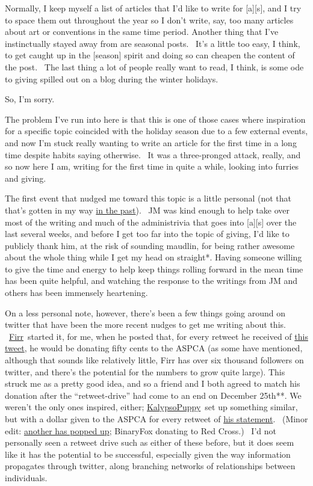 Normally, I keep myself a list of articles that I'd like to write for
{[}a{]}{[}s{]}, and I try to space them out throughout the year so I
don't write, say, too many articles about art or conventions in the same
time period. Another thing that I've instinctually stayed away from are
seasonal posts. ~It's a little too easy, I think, to get caught up in
the {[}season{]} spirit and doing so can cheapen the content of the
post. ~The last thing a lot of people really want to read, I think, is
some ode to giving spilled out on a blog during the winter holidays.

So, I'm sorry.

The problem I've run into here is that this is one of those cases where
inspiration for a specific topic coincided with the holiday season due
to a few external events, and now I'm stuck really wanting to write an
article for the first time in a long time despite habits saying
otherwise. ~It was a three-pronged attack, really, and so now here I am,
writing for the first time in quite a while, looking into furries and
giving.

The first event that nudged me toward this topic is a little personal
(not that that's gotten in my way
\href{http://adjectivespecies.com/2012/03/21/makyos-kaddish/}{in the
past}). ~JM was kind enough to help take over most of the writing and
much of the administrivia that goes into {[}a{]}{[}s{]} over the last
several weeks, and before I get too far into the topic of giving, I'd
like to publicly thank him, at the risk of sounding maudlin, for being
rather awesome about the whole thing while I get my head on straight*.
Having someone willing to give the time and energy to help keep things
rolling forward in the mean time has been quite helpful, and watching
the response to the writings from JM and others has been immensely
heartening.

On a less personal note, however, there's been a few things going around
on twitter that have been the more recent nudges to get me writing about
this. ~\href{https://twitter.com/Firr}{Firr}~started it, for me, when he
posted that, for every retweet he received of
\href{https://twitter.com/Firr/status/279406666108264448}{this tweet},
he would be donating fifty cents to the ASPCA (as some have mentioned,
although that sounds like relatively little, Firr has over six thousand
followers on twitter, and there's the potential for the numbers to grow
quite large). This struck me as a pretty good idea, and so a friend and
I both agreed to match his donation after the ``retweet-drive'' had come
to an end on December 25th**. We weren't the only ones inspired, either;
\href{https://twitter.com/KalypsoPuppy}{KalypsoPuppy}~set up something
similar, but with a dollar given to the ASPCA for every retweet of
\href{https://twitter.com/KalypsoPuppy/status/280431003355455488}{his
statement}. ~(Minor edit:
\href{https://twitter.com/binaryfox/status/281484976216743936}{another
has popped up}; BinaryFox donating to Red Cross.) ~I'd not personally
seen a retweet drive such as either of these before, but it does seem
like it has the potential to be successful, especially given the way
information propagates through twitter, along branching networks of
relationships between individuals.

